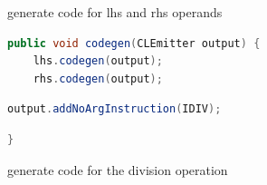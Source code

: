 \documentclass[8pt,a4paper,compress]{beamer}
\begin{document}
\begin{frame}[fragile]
\begin{overprint}
\begin{tcolorbox}[enhanced,drop shadow southwest,sharp corners,size=fbox,colback=white,fontlower=\small\ttfamily,collower=silver900]
\tcblower
\begin{minipage}[t][.25cm][t]{\textwidth}
generate code for lhs and rhs operands
\end{minipage}
\end{tcolorbox}

\begin{tcolorbox}[enhanced,drop shadow southwest,sharp corners,size=fbox,colback=white,fontlower=\small\ttfamily,collower=silver900]

\begin{lstlisting}[language=Java,style=focusout]
public void codegen(CLEmitter output) {
    lhs.codegen(output);
    rhs.codegen(output);
\end{lstlisting}
\begin{lstlisting}[language=Java,style=focusin,backgroundcolor=\color{lime100}]
    output.addNoArgInstruction(IDIV);
\end{lstlisting}
\begin{lstlisting}[language=Java,style=focusout]
}
\end{lstlisting}

\tcblower
\begin{minipage}[t][.25cm][t]{\textwidth}
generate code for the division operation
\end{minipage}
\end{tcolorbox}

\end{overprint}
\end{frame}
\end{document}
